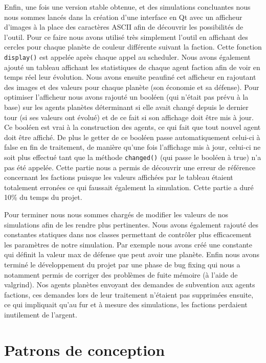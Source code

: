   Enfin, une fois une version stable obtenue, et des simulations concluantes nous nous sommes lancés dans la création d’une interface en Qt avec un afficheur d’images à la place des caractères ASCII afin de découvrir les possibilités de l’outil. Pour ce faire nous avons utilisé très simplement l’outil en affichant des cercles pour chaque planète de couleur différente suivant la faction. Cette fonction \texttt{display()} est appelée après chaque appel au scheduler. Nous avons également ajouté un tableau affichant les statistiques de chaque agent faction afin de voir en temps réel leur évolution. Nous avons ensuite peaufiné cet afficheur en rajoutant des images et des valeurs pour chaque planète (son économie et sa défense). Pour optimiser l’afficheur nous avons rajouté un booléen (qui n’était pas prévu à la base) sur les agents planètes déterminant si elle avait changé depuis le dernier tour (si ses valeurs ont évolué) et de ce fait si son affichage doit être mis à jour. Ce booléen est vrai à la construction des agents, ce qui fait que tout nouvel agent doit être affiché. De plus le getter de ce booléen passe automatiquement celui-ci à false en fin de traitement, de manière qu’une fois l’affichage mis à jour, celui-ci ne soit plus effectué tant que la méthode \texttt{changed()} (qui passe le booléen à true) n’a pas été appelée. Cette partie nous a permis de découvrir une erreur de référence concernant les factions puisque les valeurs affichées par le tableau étaient totalement erronées ce qui faussait également la simulation. Cette partie a duré 10\% du temps du projet.

  Pour terminer nous nous sommes chargés de modifier les valeurs de nos simulations afin de les rendre plus pertinentes. Nous avons également rajouté des constantes statiques dans nos classes permettant de contrôler plus efficacement les paramètres de notre simulation. Par exemple nous avons créé une constante  qui définit la valeur max de défense que peut avoir une planète. Enfin nous avons terminé le développement du projet par une phase de bug fixing qui nous a notamment permis de corriger des problèmes de fuite mémoire (à l’aide de valgrind). Nos agents planètes envoyant des demandes de subvention aux agents factions, ces demandes lors de leur traitement n’étaient pas supprimées ensuite, ce qui impliquait qu’au fur et à mesure des simulations, les factions perdaient inutilement de l’argent.

  \section{Patrons de conception}

